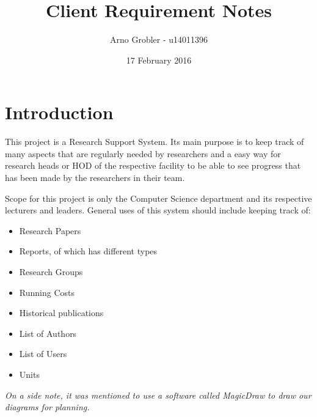 \documentclass[12pt, letterpaper, twoside]{article}
\title{Client Requirement Notes}
\author{Arno Grobler - u14011396}
\date{17 February 2016}
\begin{document}
 
\begin{titlepage}
\maketitle
\end{titlepage}
 
\tableofcontents
\newpage

\section{Introduction}

This project is a Research Support System. Its main purpose is to keep track of many aspects that are regularly needed by researchers and a easy way for research heads or HOD of the respective facility to be able to see progress that has been made by the researchers in their team.

Scope for this project is only the Computer Science department and its respective lecturers and leaders.
General uses of this system should include keeping track of:
\begin{itemize}  

    \item Research Papers

    \item Reports, of which has different types
    \item Research Groups
    \item Running Costs
    \item Historical publications
    \item List of Authors
    \item List of Users
    \item Units 

\end{itemize}
{\textit{On a side note, it was mentioned to use a software called MagicDraw to draw our diagrams for planning.}}
\end{document}
